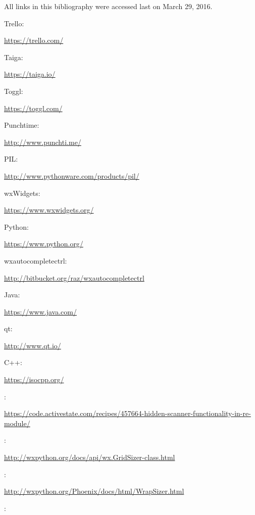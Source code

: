\documentclass[12pt,a4paper,naustrian,english,oneside,openright,DIV=12,BCOR=1cm]{scrbook}
\begin{document}

\begin{thebibliography}{999}
	
	\item[]\hspace{-\labelwidth}\hspace{-\labelsep}All links in this bibliography were accessed last on March 29, 2016.
	
	
	 Trello: 
	 
	\url{https://trello.com/}
	
	 Taiga:  
	
	\url{https://taiga.io/}
	
	 Toggl: 
	 
	\url{https://toggl.com/}
	
	 Punchtime:  
	
	\url{http://www.punchti.me/}
	
	 PIL:  
	
	\url{http://www.pythonware.com/products/pil/}
	
	 wxWidgets:  
	
	\url{https://www.wxwidgets.org/}
	
	 Python:  
	
	\url{https://www.python.org/}
	
	 wxautocompletectrl: 
	 
	\url{http://bitbucket.org/raz/wxautocompletectrl}
	
	 Java:  
	
	\url{https://www.java.com/}
	
	 qt:  
	
	\url{http://www.qt.io/}
	
	 C++: 
	 
	\url{https://isocpp.org/}

	 :

	\url{https://code.activestate.com/recipes/457664-hidden-scanner-functionality-in-re-module/}

	 :

	\url{http://wxpython.org/docs/api/wx.GridSizer-class.html}

	 :

	\url{http://wxpython.org/Phoenix/docs/html/WrapSizer.html}

	 :


\end{thebibliography}
\end{document}
